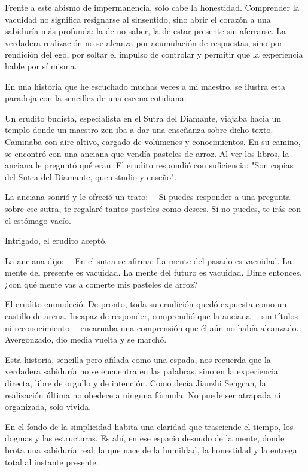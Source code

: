 \documentclass[
  a5paperpaper,
]{article}
\begin{document}
Frente a este abismo de impermanencia, solo cabe la honestidad.
Comprender la vacuidad no significa resignarse al sinsentido, sino abrir
el corazón a una sabiduría más profunda: la de no saber, la de estar
presente sin aferrarse. La verdadera realización no se alcanza por
acumulación de respuestas, sino por rendición del ego, por soltar el
impulso de controlar y permitir que la experiencia hable por sí misma.

En una historia que he escuchado muchas veces a mi maestro, se ilustra
esta paradoja con la sencillez de una escena cotidiana:

Un erudito budista, especialista en el Sutra del Diamante, viajaba hacia
un templo donde un maestro zen iba a dar una enseñanza sobre dicho
texto. Caminaba con aire altivo, cargado de volúmenes y conocimientos.
En su camino, se encontró con una anciana que vendía pasteles de arroz.
Al ver los libros, la anciana le preguntó qué eran. El erudito respondió
con suficiencia: "Son copias del Sutra del Diamante, que estudio y
enseño".

La anciana sonrió y le ofreció un trato: ---Si puedes responder a una
pregunta sobre ese sutra, te regalaré tantos pasteles como desees. Si no
puedes, te irás con el estómago vacío.

Intrigado, el erudito aceptó.

La anciana dijo: ---En el sutra se afirma: La mente del pasado es
vacuidad. La mente del presente es vacuidad. La mente del futuro es
vacuidad. Dime entonces, ¿con qué mente vas a comerte mis pasteles de
arroz?

El erudito enmudeció. De pronto, toda su erudición quedó expuesta como
un castillo de arena. Incapaz de responder, comprendió que la anciana
---sin títulos ni reconocimiento--- encarnaba una comprensión que él aún
no había alcanzado. Avergonzado, dio media vuelta y se marchó.

Esta historia, sencilla pero afilada como una espada, nos recuerda que
la verdadera sabiduría no se encuentra en las palabras, sino en la
experiencia directa, libre de orgullo y de intención. Como decía Jianzhi
Sengcan, la realización última no obedece a ninguna fórmula. No puede
ser atrapada ni organizada, solo vivida.

En el fondo de la simplicidad habita una claridad que trasciende el
tiempo, los dogmas y las estructuras. Es ahí, en ese espacio desnudo de
la mente, donde brota una sabiduría real: la que nace de la humildad, la
honestidad y la entrega total al instante presente.
\end{document}
